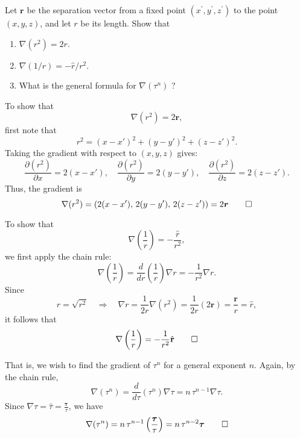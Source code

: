 \begin{hwkProblem}{1.6}{}
\end{hwkProblem}

\begin{hwkProblem}{1.13}{}

	Let \(\boldsymbol{r}\) be the separation vector from a fixed point \(\left(x^{\prime}, y^{\prime}, z^{\prime}\right)\) to the point \((x, y, z)\), and let \(r\) be its length. Show that
	\begin{enumerate}
		\item \(\nabla\left(r^2\right)=2 r\).
		\item \(\nabla(1 / r)=-\hat{r} / r^2\).
		\item What is the general formula for \(\nabla\left(\tau^n\right)\) ?
	\end{enumerate}

	\hwkSol

	\hwkPart

	To show that
	\[
		\nabla\left(r^2\right)=2\boldsymbol{r},
	\]
	first note that
	\[
		r^2 = (x-x')^2 + (y-y')^2 + (z-z')^2.
	\]
	Taking the gradient with respect to \( \left(x, y, z\right)\) gives:
	\[
		\frac{\partial (r^2)}{\partial x} = 2(x-x'),\quad \frac{\partial (r^2)}{\partial y} = 2(y-y'),\quad \frac{\partial (r^2)}{\partial z} = 2(z-z').
	\]
	Thus, the gradient is
	\[
		\nabla(r^2) = \left(2(x-x'),\, 2(y-y'),\, 2(z-z')\right) = 2\boldsymbol{r} \qed
	\]

	\hwkPart

	To show that
	\[
		\nabla\left(\frac{1}{r}\right)=-\frac{\hat{r}}{r^2},
	\]
	we first apply the chain rule:
	\[
		\nabla\left(\frac{1}{r}\right) = \frac{d}{dr}\left(\frac{1}{r}\right) \nabla r = -\frac{1}{r^2}\nabla r.
	\]
	Since
	\[
		r = \sqrt{r^2} \quad \Longrightarrow \quad \nabla r = \frac{1}{2r}\nabla (r^2) = \frac{1}{2r}(2\boldsymbol{r}) = \frac{\boldsymbol{r}}{r} = \hat{r},
	\]
	it follows that
	\[
		\nabla\left(\frac{1}{r}\right) = -\frac{1}{r^2}\hat{r} \qed
	\]

	\hwkPart

	That is, we wish to find the gradient of \(\tau^n\) for a general exponent \( n \). Again, by the chain rule,
	\[
		\nabla(\tau^n)= \frac{d}{d\tau}(\tau^n) \nabla \tau = n\,\tau^{n-1}\nabla \tau.
	\]
	Since \(\nabla \tau = \hat{\tau} = \frac{\boldsymbol{\tau}}{\tau}\), we have
	\[
		\nabla(\tau^n)= n\,\tau^{n-1}\left(\frac{\boldsymbol{\tau}}{\tau}\right)= n\,\tau^{n-2}\boldsymbol{\tau} \qed
	\]

\end{hwkProblem}

